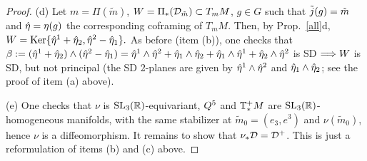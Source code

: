 \begin{proof}
 
 
\mn(d)  Let $m=\Pi(\tilde m)$,  $W=\Pi_*({\mathcal D}_{\tilde m})\subset T_mM$, $g\in G$ such that ${\tilde j}(g)=\tilde m$  and  $\hat\eta=\eta(g)$ the corresponding coframing of $T_mM$. Then, by Prop.~\ref{all}d,  $W={\rm Ker}\{\hat\eta^1+\hat\eta_2, \hat\eta^2-\hat\eta_1\}.$ As before (item (b)),  one checks that $\beta:=(\hat\eta^1+\hat\eta_2)\wedge(\hat\eta^2-\hat\eta_1)=\hat\eta^1\wedge\hat\eta^2+\hat\eta_1\wedge\hat\eta_2+\hat\eta_1\wedge\hat\eta^1+\hat\eta_2\wedge\hat\eta^2$ is SD $\Longrightarrow W$ is SD, but not principal (the SD 2-planes are given by $\hat\eta^1\wedge\hat\eta^2$ and $\hat\eta_1\wedge\hat\eta_2$; see the proof of item (a) above). 

 
  
\mn(e)  One checks that $\nu$ is  ${\mathrm{SL}_3(\mathbb{R})}$-equivariant, $Q^5$ and $\mathbb{T}^+_*M$ are ${\mathrm{SL}_3(\mathbb{R})}$-homogeneous manifolds, with the same stabilizer at $\tilde m_0=(e_3, e^3)$ and $\nu(\tilde m_0)$, hence $\nu$  is a diffeomorphism. It remains to show that   $\nu_*{\mathcal D}={\mathcal D}^+$. This is just a reformulation  of items (b) and (c) above. 
\end{proof}




